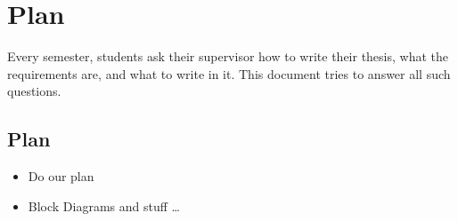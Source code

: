 \chapter{Plan}\label{ch:plan}

Every semester, students ask their supervisor how to write their thesis,
what the requirements are, and what to write in it.  
This document tries to answer all such questions.

\section{Plan}

\begin{itemize}
  \item Do our plan
  \item Block Diagrams and stuff
\ldots
\end{itemize}
